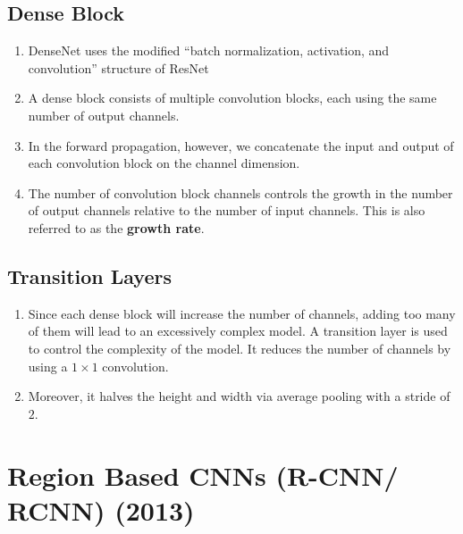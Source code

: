 \subsection{Dense Block \cite{dnn-1}}

\begin{enumerate}
    \item DenseNet uses the modified “batch normalization, activation, and convolution” structure of ResNet

    \item A dense block consists of multiple convolution blocks, each using the same number of output channels. 
    
    \item In the forward propagation, however, we concatenate the input and output of each convolution block on the channel dimension.

    \item The number of convolution block channels controls the growth in the number of output channels relative to the number of input channels. This is also referred to as the \textbf{growth rate}.
\end{enumerate}


\subsection{Transition Layers \cite{dnn-1}}

\begin{enumerate}
    \item Since each dense block will increase the number of channels, adding too many of them will lead to an excessively complex model. A transition layer is used to control the complexity of the model. It reduces the number of channels by using a $1 \times 1$ convolution. 
    
    \item Moreover, it halves the height and width via average pooling with a stride of $2$.



\end{enumerate}












\section{Region Based CNNs (R-CNN/ RCNN) (2013) \cite{arxiv-1311.2524v5-rcnn,https://www.geeksforgeeks.org/r-cnn-region-based-cnns/}}\label{Region Based CNNs (R-CNN/ RCNN)}

